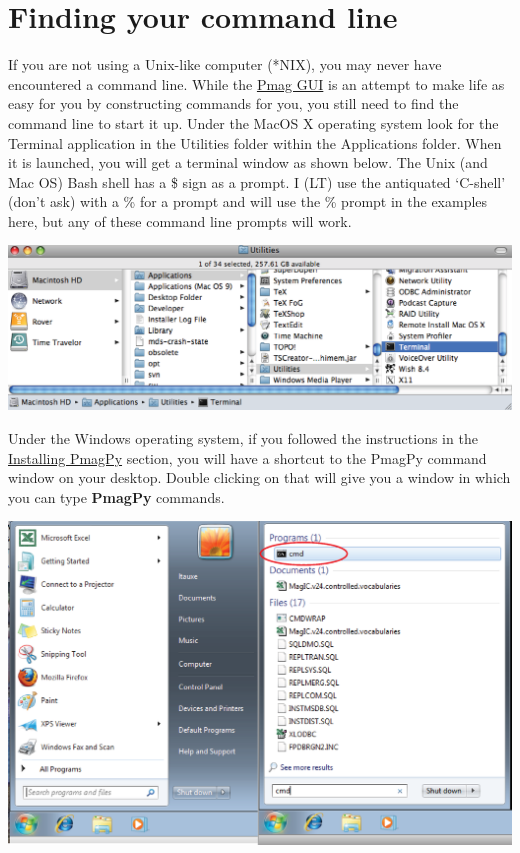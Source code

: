 \documentclass[11pt]{book}
\begin{document}
{
\section{Finding your command line}
If you are not using a Unix-like computer (*NIX), you may never have encountered a command line. While the \href{#pmag_gui.py}{Pmag GUI} is an attempt to make life as easy for you by constructing commands for you, you still need to find the command line to start it up.  Under the MacOS X operating system look for the Terminal application in the Utilities folder within the Applications folder. When it is launched, you will get a terminal window as shown below.  The Unix (and Mac OS) Bash shell has a \$ sign as a prompt.  I (LT) use the antiquated `C-shell'  (don't ask) with a \% for a prompt and  will use the \% prompt in the examples here, but any of these command line prompts will work.

  \includegraphics[width=15cm]{EPSfiles/terminal.eps}

Under the Windows operating system, if you followed the instructions in the  \href{#quick_start}{Installing PmagPy} section, you will have a shortcut to the PmagPy command window on your desktop.  Double clicking on that will give you a window in which you can type {\bf PmagPy} commands.

  \includegraphics[width=15cm]{EPSfiles/cmd.eps}

}
\end{document}
